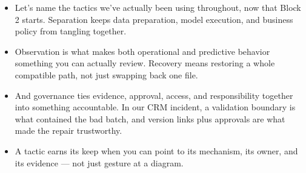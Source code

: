 \documentclass[11pt,a4paper]{article}
\begin{document}
\begin{examplebox}[title after break={SPOKEN SCRIPT --- slide 34 continued}]
\begin{itemize}
\item Let's name the tactics we've actually been using throughout, now that Block 2 starts. Separation keeps data preparation, model execution, and business policy from tangling together.
\item Observation is what makes both operational and predictive behavior something you can actually review. Recovery means restoring a whole compatible path, not just swapping back one file.
\item And governance ties evidence, approval, access, and responsibility together into something accountable. In our CRM incident, a validation boundary is what contained the bad batch, and version links plus approvals are what made the repair trustworthy.
\item A tactic earns its keep when you can point to its mechanism, its owner, and its evidence — not just gesture at a diagram.
\end{itemize}
\end{examplebox}
\par\noindent{\scriptsize\textcolor{teal!60!black}{Reading anchor: Bass, Ch. 14 · Bass, Ch. 9–11 · Group Block 2 outline}}
\clearpage
\end{document}
